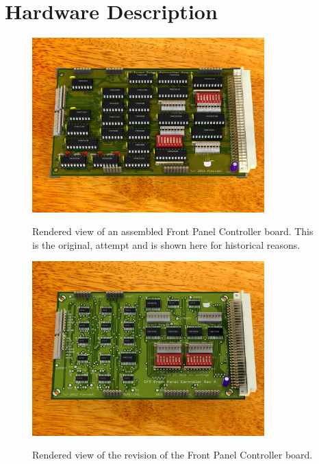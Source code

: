 \section{Hardware Description}

\begin{figure}
\centering
\includegraphics[width=0.8\textwidth]{figs/front-panel-controller-dip.jpg}\\
\caption[Rendered view of an assembled Front Panel
  Controller board]{\label{fig-rendered-fpc-dip}Rendered view of an assembled Front Panel
  Controller board. This is the original,  attempt and is shown here for
  historical reasons.}
\end{figure}

\begin{figure}
\centering
\includegraphics[width=0.8\textwidth]{figs/front-panel-controller-smd.jpg}\\
\caption{\label{fig-rendered-fpc-smd}Rendered view of the  revision of the
  Front Panel Controller board.}
\end{figure}


